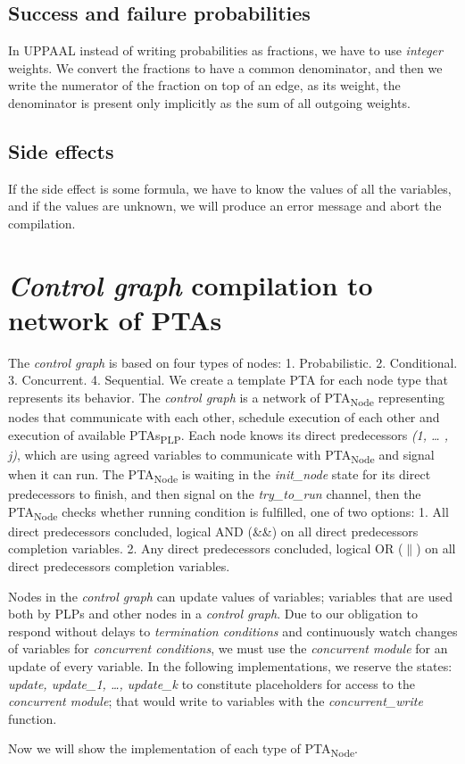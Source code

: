 \subsection{Success and failure probabilities }
In UPPAAL instead of writing probabilities as fractions, we have to use \textit{integer} weights. We convert the fractions to have a common denominator, and then we write the numerator of the fraction on top of an edge, as its weight, the denominator is present only implicitly as the sum of all outgoing weights. \\
\subsection{Side effects}
If the side effect is some formula, we have to know the values of all the variables, and if the values are unknown, we will produce an error message and abort the compilation.\\
\section{\textit{Control graph} compilation to network of PTAs}
The \textit{control graph} is based on four types of nodes: 1. Probabilistic. 2. Conditional. 3. Concurrent. 4. Sequential. We create a template PTA for each node type that represents its behavior. The \textit{control graph} is a network of PTA\textsubscript{Node} representing nodes that communicate with each other, schedule execution of each other and execution of available PTAs\textsubscript{PLP}. Each node knows its direct predecessors \textit{(1, … , j)}, which are using agreed variables to communicate with PTA\textsubscript{Node} and signal when it can run. The PTA\textsubscript{Node} is waiting in the \textcolor{ColorUppaalState}{\textit{init_node}} state for its direct predecessors to finish, and then signal on the \textcolor{ColorUppaalChannel}{\textit{try_to_run }}channel, then the PTA\textsubscript{Node} checks whether running condition is fulfilled, one of two options: 1. All direct predecessors concluded, logical AND (\&\&) on all direct predecessors completion variables. 2. Any direct predecessors concluded, logical OR ($\|$) on all direct predecessors completion variables.
\par Nodes in the \textit{control graph} can update values of variables; variables that are used both by PLPs and other nodes in a \textit{control graph}. Due to our obligation to respond without delays to \textit{termination conditions} and continuously watch changes of variables for \textit{concurrent conditions}, we must use the \textit{concurrent module} for an update of every variable. In the following implementations, we reserve the states: \textit{\textcolor{ColorUppaalState}{update, update\_1, …, update\_k}} to constitute placeholders for access to the \textit{concurrent module}; that would write to variables with the \textcolor{ColorUppaalFunction}{\textit{concurrent_write}}​ function.
\par Now we will show the implementation of each type of PTA\textsubscript{Node}.\\
\clearpage
